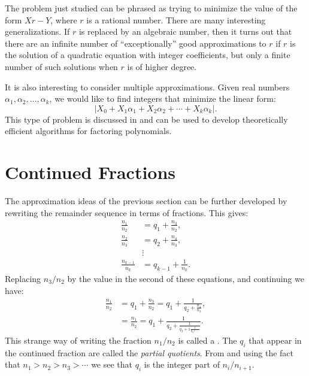 The problem just studied can be phrased as trying to minimize the
value of the form $X r - Y$, where $r$ is a rational number.  There are
many interesting generalizations.  If $r$ is replaced by an algebraic
number, then it turns out that there are an infinite number of
``exceptionally'' good approximations to $r$ if $r$ is the solution of
a quadratic equation with integer coefficients, but only a finite
number of such solutions when $r$ is of higher degree.

It is also interesting to consider multiple approximations.  Given
real numbers $\alpha_1, \alpha_2, \ldots, \alpha_k$, we would like to
find integers that minimize the linear form:
\[
\left|X_0 + X_1 \alpha_1 + X_2 \alpha_2 + \cdots + X_k \alpha_k \right|.
\]
This type of problem is discussed in  and can be
used to develop theoretically efficient algorithms for factoring
polynomials.

\section{Continued Fractions}
\label{Euclid:CF:Sec}

The approximation ideas of the previous section can be further developed
by rewriting the remainder sequence  in terms
of fractions.  This gives:
\begin{equation}\label{Euclid:CF:Eq}
  \begin{aligned}
    \frac{n_1}{n_2} &= q_1 + \frac{n_3}{n_2},\\
    \frac{n_2}{n_3} &= q_2 + \frac{n_4}{n_3},\\
     &\vdots\\
    \frac{n_{k-1}}{n_k} &=  q_{k-1} + \frac{1}{n_k}.
  \end{aligned}
\end{equation}
Replacing $n_3/n_2$ by the value in the second of these equations,
and continuing we have:
\[
\begin{aligned}
\frac{n_1}{n_2} &= q_1 + \frac{n_3}{n_2} = 
 q_1 + \frac{1}{\displaystyle q_2 + \frac{n_4}{n_3}}, \\
& = \frac{n_1}{n_2} = q_1 + \frac{1}{\displaystyle q_2 + 
    \frac{1}{\displaystyle q_3 + 1 \frac{1}{\displaystyle q_4 +
\ddots}}}.
\end{aligned}
\]
This strange way of writing the fraction $n_1/n_2$ is called a
.   The $q_i$ that appear in the continued
fraction are called the {\em partial quotients}. From
 and using the fact that $n_1 > n_2 > n_3 >
\cdots$ we see that  $q_i$ is the integer part of $n_i/n_{i+1}$.

